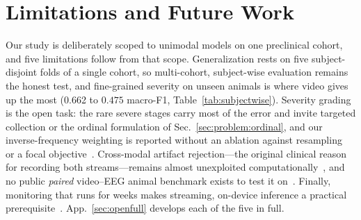 \section{Limitations and Future Work}
\label{sec:open}

Our study is deliberately scoped to unimodal models on one preclinical cohort, and
five limitations follow from that scope. Generalization rests on five
subject-disjoint folds of a single cohort, so multi-cohort, subject-wise evaluation
remains the honest test, and fine-grained severity on unseen animals is where video
gives up the most (0.662 to $0.475$ macro-F1, Table~\ref{tab:subjectwise}). Severity
grading is the open task: the rare severe stages carry most of the error and invite
targeted collection or the ordinal formulation of Sec.~\ref{sec:problem:ordinal},
and our inverse-frequency weighting is reported without an ablation against
resampling~\cite{chawla2002smote} or a focal objective~\cite{lin2017focal}.
Cross-modal artifact rejection---the original clinical reason for recording both
streams---remains almost unexploited computationally~\cite{frontiers_fusion2026},
and no public \emph{paired} video--EEG animal benchmark exists to test it
on~\cite{rodepil2025}. Finally, monitoring that runs for weeks makes streaming,
on-device inference a practical prerequisite~\cite{vepinet2024}.
App.~\ref{sec:openfull} develops each of the five in full.
